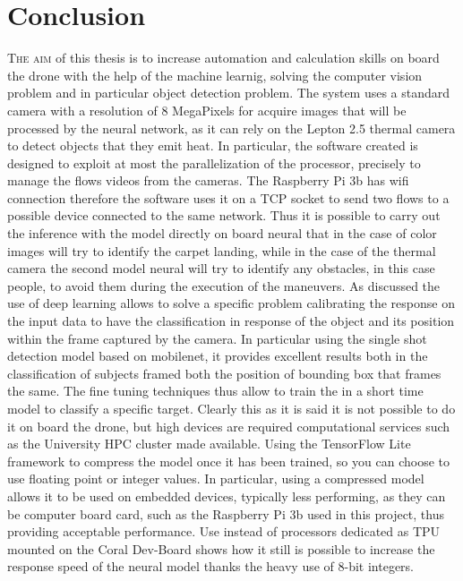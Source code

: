 \chapter{Conclusion}
\label{chap:conclusion}
%
\lettrine[lines=3]{T}{he aim} of this thesis is to increase automation and 
calculation skills on board the drone with the help of the machine learnig, 
solving the computer vision problem and in particular object detection problem.
The system uses a standard camera with a resolution of 8 MegaPixels for acquire
images that will be processed by the neural network, as it can rely on the
Lepton 2.5 thermal camera to detect objects that they emit heat. In particular,
the software created is designed to exploit at most the parallelization of the
processor, precisely to manage the flows videos from the cameras. 
The Raspberry Pi 3b has wifi connection therefore the software uses it on a TCP
socket to send two flows to a possible device connected to the same network.
Thus it is possible to carry out the inference with the model directly on board
neural that in the case of color images will try to identify the carpet landing,
while in the case of the thermal camera the second model neural will try to
identify any obstacles, in this case people, to avoid them during the execution
of the maneuvers.
As discussed the use of deep learning allows to solve a specific problem
calibrating the response on the input data to have the classification in
response of the object and its position within the frame captured by the camera.
In particular using the single shot detection model based on mobilenet, it
provides excellent results both in the classification of subjects framed both
the position of bounding box that frames the same.
The fine tuning techniques thus allow to train the in a short time model to
classify a specific target. Clearly this as it is said it is not possible to do
it on board the drone, but high devices are required computational services such
as the University HPC cluster made available.
Using the TensorFlow Lite framework to compress the model once it has been
trained, so you can choose to use floating point or integer values. 
In particular, using a compressed model allows it to be used on embedded
devices, typically less performing, as they can be computer board card, such as
the Raspberry Pi 3b used in this project, thus providing acceptable performance.
Use instead of processors dedicated as TPU mounted on the Coral Dev-Board shows
how it still is possible to increase the response speed of the neural model
thanks the heavy use of 8-bit integers. 
